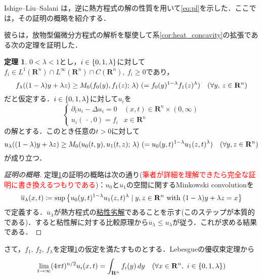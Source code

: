 \documentclass[a4j]{ltjsarticle}
\newcommand{\Rset}{\mathbf{R}}
\newcommand{\1}{\bm{1}}
\newcommand{\M}[4]{M_{#1}\qty(#2,#3;\,#4)}
\numberwithin{equation}{section}
\theoremstyle{definition}
\newtheorem{thm}{定理}[section]
\begin{document}
Ishige--Liu--Salani \cite{ILS}は，逆に熱方程式の解の性質を用いて\eqref{eq:pl}を示した．ここでは，その証明の概略を紹介する．

彼らは，放物型偏微分方程式の解析を駆使して系\ref{cor:heat_concavity}の拡張である次の定理を証明した．
\begin{thm}\label{thm:conc_preserve}
    $0<\lambda<1$とし，$i\in\qty{0,1,\lambda}$に対して$f_i\in L^1(\Rset^n)\cap L^\infty(\Rset^n)\cap C(\Rset^n),\ f_i\geq0$であり，
    \begin{equation}
        f_\lambda((1-\lambda)y+\lambda z)\geq \M{0}{f_0(y)}{f_1(z)}{\lambda}\ (=f_0(y)^{1-\lambda}f_1(z)^{\lambda})\quad (\forall y,\,z\in\Rset^n)\label{eq:conc_preserve_assump}
    \end{equation}
    だと仮定する．$i\in\qty{0,1,\lambda}$に対して$u_i$を
    \begin{equation}
        \left\{
        \begin{array}{rl}
            \partial_{t}u_i-\Delta u_i=0 & (x,t)\in\Rset^n\times (0,\infty)\\
            u_i(\,\cdot\,,0)=f_i & x\in\Rset^n
        \end{array}
        \right.
    \end{equation}
    の解とする．このとき任意の$t>0$に対して
    \begin{equation}
        u_\lambda((1-\lambda)y+\lambda z)\geq \M{0}{u_0(t,y)}{u_1(t,z)}{\lambda}\ (=u_{0}(y,t)^{1-\lambda}u_{1}(z,t)^{\lambda})\quad (\forall y,z\in\Rset^n)
    \end{equation}
    が成り立つ．
\end{thm}
\begin{proof}[\textup{証明の概略}]
    定理\ref{thm:conc_preserve}の証明の概略は次の通り(\textcolor{red}{筆者が詳細を理解できたら完全な証明に書き換えるつもりである})：$u_0$と$u_1$の空間に関するMinkowski convolutionを
    \begin{equation}
        \overline{u}_{\lambda}(x,t)\coloneqq \sup\qty{u_{0}(y,t)^{1-\lambda}u_1(z,t)^{\lambda}\mid y,z\in\Rset^n\ \text{with}\ (1-\lambda)y+\lambda z=x}
    \end{equation}
    で定義する．$\overline{u}_{\lambda}$が熱方程式の\underline{粘性劣解}であることを示す(このステップが本質的である)．すると粘性解に対する比較原理から$\overline{u}_{\lambda}\leq u_{\lambda}$が従う．これが求める結果である．
\end{proof}
さて，$f_1,\,f_2,\,f_\lambda$を定理\ref{thm:conc_preserve}の仮定を満たすものとする．Lebesgueの優収束定理から
\begin{equation}
    \lim_{t\to\infty}(4\pi t)^{n/2}u_i(x,t)=\int_{\Rset^n}f_i(y)\,dy\quad (\forall x\in\Rset^n,\ i\in\qty{0,1,\lambda})
\end{equation}
\end{document}
